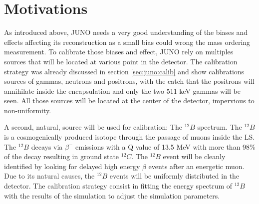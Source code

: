 \documentclass[../main.tex]{subfiles}
\begin{document}
\section{Motivations}
\label{sec:janne:motivation}

As introduced above, JUNO needs a very good understanding of the biases and effects affecting its reconstruction as a small bias could wrong the mass ordering measurement. To calibrate those biases and effect, JUNO rely on multiples sources that will be located at various point in the detector. The calibration strategy was already discussed in section \ref{sec:juno:calib} and show calibrations sources of gammas, neutrons and positrons, with the catch that the positrons will annihilate inside the encapsulation and only the two 511 keV gammas will be seen. All those sources will be located at the center of the detector, impervious to non-uniformity.

A second, natural, source will be used for calibration: The $^{12}B$ spectrum. The $^{12}B$ is a cosmogenically produced isotope through the passage of muons inside the LS. The $^{12}B$ decays via $\beta^-$ emissions with a Q value of 13.5 MeV with more than 98\% of the decay resulting in ground state $^{12}C$. The $^{12}B$ event will be cleanly identified by looking for delayed high energy $\beta$ events after an energetic muon. Due to its natural causes, the $^{12}B$ events will be uniformly distributed in the detector. The calibration strategy consist in fitting the energy spectrum of $^{12}B$ with the results of the simulation to adjust the simulation parameters.
\end{document}

